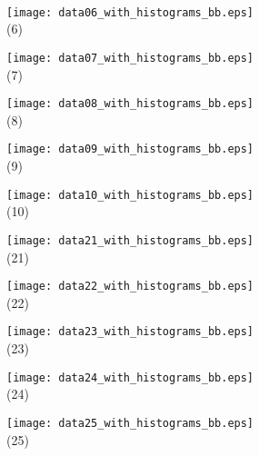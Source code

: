 \documentclass[journal]{vgtc}                %
\begin{document}
\begin{figure*}[ht!]
    \mbox{} \\   \smallskip
  
  
  \begin{minipage}{0.19\textwidth}
   \centering
     \texttt{[image: data06\_with\_histograms\_bb.eps]}\\
     \footnotesize (6)
  \end{minipage}
  \hfill
  \begin{minipage}{0.19\textwidth}
   \centering
     \texttt{[image: data07\_with\_histograms\_bb.eps]}\\
     \footnotesize (7)
  \end{minipage}
  \hfill
  \begin{minipage}{0.19\textwidth}
   \centering
     \texttt{[image: data08\_with\_histograms\_bb.eps]}\\
     \footnotesize (8)
  \end{minipage}
  \hfill
  \begin{minipage}{0.19\textwidth}
   \centering
     \texttt{[image: data09\_with\_histograms\_bb.eps]}\\
     \footnotesize (9)
  \end{minipage}
  \hfill
  \begin{minipage}{0.19\textwidth}
   \centering
     \texttt{[image: data10\_with\_histograms\_bb.eps]}\\
     \footnotesize (10)
  \end{minipage}

    \mbox{}  \smallskip

  \begin{minipage}{0.19\textwidth}
   \centering
     \texttt{[image: data21\_with\_histograms\_bb.eps]}\\
     \footnotesize (21)
  \end{minipage}
  \hfill
  \begin{minipage}{0.19\textwidth}
   \centering
     \texttt{[image: data22\_with\_histograms\_bb.eps]}\\
     \footnotesize (22)
  \end{minipage}
  \hfill
  \begin{minipage}{0.19\textwidth}
   \centering
     \texttt{[image: data23\_with\_histograms\_bb.eps]}\\
     \footnotesize (23)
  \end{minipage}
  \hfill
  \begin{minipage}{0.19\textwidth}
   \centering
     \texttt{[image: data24\_with\_histograms\_bb.eps]}\\
     \footnotesize (24)
  \end{minipage}
  \hfill
  \begin{minipage}{0.19\textwidth}
   \centering
     \texttt{[image: data25\_with\_histograms\_bb.eps]}\\
     \footnotesize (25)
  \end{minipage}
  

\end{figure*}
\end{document}
